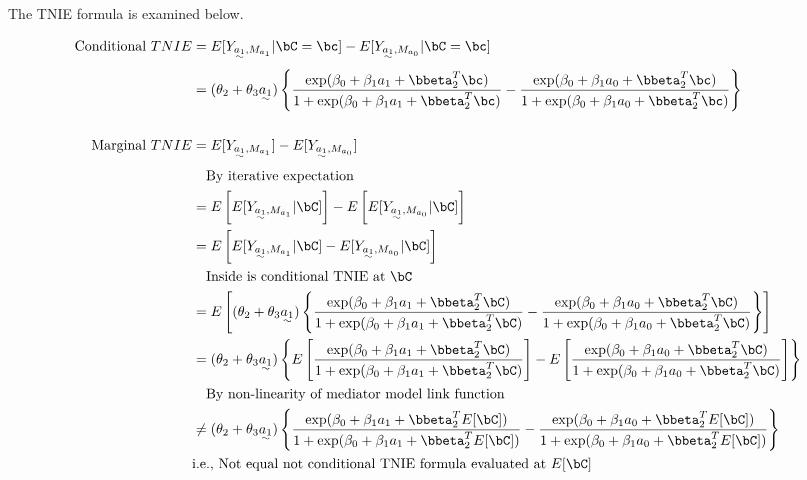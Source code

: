 \documentclass[dvipdfmx,10pt]{article}
\begin{document}
The TNIE formula is examined below.

\begin{align*}
  \text{Conditional }TNIE
  &= E[Y_{\uwave{a_{1}},M_{a_{1}}} | \bC = \bc] - E[Y_{\uwave{a_{1}},M_{a_{0}}} | \bC = \bc]\\
  &= (\theta_{2} + \theta_{3}\uwave{a_{1}})\left\{
    \frac
    {    \exp(\beta_{0} + \beta_{1}a_{1} + \bbeta_{2}^{T}\bc)}
    {1 + \exp(\beta_{0} + \beta_{1}a_{1} + \bbeta_{2}^{T}\bc)}
    -
    \frac
    {    \exp(\beta_{0} + \beta_{1}a_{0} + \bbeta_{2}^{T}\bc)}
    {1 + \exp(\beta_{0} + \beta_{1}a_{0} + \bbeta_{2}^{T}\bc)}
    \right\}\\
  \\
  \text{Marginal }TNIE
  &= E[Y_{\uwave{a_{1}},M_{a_{1}}}] - E[Y_{\uwave{a_{1}},M_{a_{0}}}]\\
  &~~~\text{By iterative expectation}\\
  &= E \left[ E[Y_{\uwave{a_{1}},M_{a_{1}}} | \bC] \right] - E \left[ E[Y_{\uwave{a_{1}},M_{a_{0}}} | \bC] \right]\\
  &= E \left[ E[Y_{\uwave{a_{1}},M_{a_{1}}} | \bC] - E[Y_{\uwave{a_{1}},M_{a_{0}}} | \bC] \right]\\
  &~~~\text{Inside is conditional TNIE at }\bC\\
  &= E \left[ (\theta_{2} + \theta_{3}\uwave{a_{1}})\left\{
    \frac
    {    \exp(\beta_{0} + \beta_{1}a_{1} + \bbeta_{2}^{T}\bC)}
    {1 + \exp(\beta_{0} + \beta_{1}a_{1} + \bbeta_{2}^{T}\bC)}
    -
    \frac
    {    \exp(\beta_{0} + \beta_{1}a_{0} + \bbeta_{2}^{T}\bC)}
    {1 + \exp(\beta_{0} + \beta_{1}a_{0} + \bbeta_{2}^{T}\bC)}
    \right\} \right]\\
  &= (\theta_{2} + \theta_{3}\uwave{a_{1}})\left\{
    E \left[ \frac
    {    \exp(\beta_{0} + \beta_{1}a_{1} + \bbeta_{2}^{T}\bC)}
    {1 + \exp(\beta_{0} + \beta_{1}a_{1} + \bbeta_{2}^{T}\bC)} \right]
    -
    E \left[ \frac
    {    \exp(\beta_{0} + \beta_{1}a_{0} + \bbeta_{2}^{T}\bC)}
    {1 + \exp(\beta_{0} + \beta_{1}a_{0} + \bbeta_{2}^{T}\bC)} \right]
    \right\}\\
  &~~~\text{By non-linearity of mediator model link function}\\
  &\ne (\theta_{2} + \theta_{3}\uwave{a_{1}})\left\{
    \frac
    {    \exp(\beta_{0} + \beta_{1}a_{1} + \bbeta_{2}^{T}E[\bC])}
    {1 + \exp(\beta_{0} + \beta_{1}a_{1} + \bbeta_{2}^{T}E[\bC])}
    -
    \frac
    {    \exp(\beta_{0} + \beta_{1}a_{0} + \bbeta_{2}^{T}E[\bC])}
    {1 + \exp(\beta_{0} + \beta_{1}a_{0} + \bbeta_{2}^{T}E[\bC])}
    \right\}\\
  &\text{i.e., Not equal not conditional TNIE formula evaluated at }E[\bC]\\
\end{align*}
\end{document}
